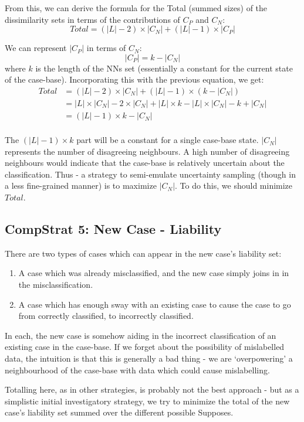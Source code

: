 \documentclass[a4paper,11pt]{report}
\begin{document}
From this, we can derive the formula for the Total (summed sizes) of the dissimilarity sets in terms of the contributions of $C_{P}$ and $C_{N}$:
\[ Total= (|L| - 2)\times |C_{N}| +(|L| - 1)\times |C_{P}|  \] 

We can represent $|C_{P}|$ in terms of $C_{N}$:
\[ |C_{P}| = k -  |C_{N}| \]
where $k$ is the length of the NNs set (essentially a constant for the current state of the case-base). Incorporating this with the previous equation, we get:
\begin{align*}
Total &= (|L| - 2)\times |C_{N}| +(|L| - 1)\times (k - |C_{N}|) \\
&= |L| \times |C_{N}| - 2\times|C_{N}| + |L|\times k - |L| \times |C_{N}| - k + |C_{N}| \\
&= (|L| - 1) \times k - |C_{N}| \\
\end{align*} 

The $ (|L| - 1) \times k $ part will be a constant for a single case-base state. $|C_{N}|$ represents the number of disagreeing neighbours. A high number of disagreeing neighbours would indicate that the case-base is relatively uncertain about the classification. Thus - a strategy to semi-emulate uncertainty sampling (though in a less fine-grained manner) is to maximize $|C_{N}|$. To do this, we should minimize $Total$.

\subsection{CompStrat 5: New Case - Liability}
There are two types of cases which can appear in the new case's liability set:
\begin{enumerate}
	\item A case which was already misclassified, and the new case simply joins in in the misclassification.
	\item A case which has enough sway with an existing case to cause the case to go from correctly classified, to incorrectly classified.
\end{enumerate}

In each, the new case is somehow aiding in the incorrect classification of an existing case in the case-base. If we forget about the possibility of mislabelled data, the intuition is that this is generally a bad thing - we are `overpowering' a neighbourhood of the case-base with data which could cause mislabelling.

Totalling here, as in other strategies, is probably not the best approach - but as a simplistic initial investigatory strategy, we try to minimize the total of the new case's liability set summed over the different possible Supposes.
\end{document}
